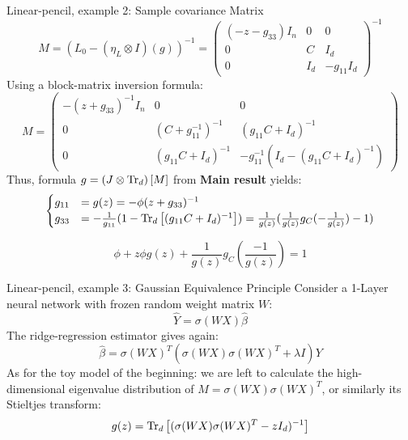 \documentclass[10pt]{beamer}
\begin{document}
\begin{frame}{Linear-pencil, example 2: Sample covariance Matrix}
  \begin{equation*}
    M= (L_0 - (\eta_L \otimes I)(g))^{-1} = 
    \begin{pmatrix}
      (-z - g_{33}) I_n & 0 & 0\\
      0 & C  & I_d\\
      0 & I_d & -g_{11} I_d
    \end{pmatrix}^{-1}
  \end{equation*}
  Using a block-matrix inversion formula:
  \begin{equation*}
    M = 
    \begin{pmatrix}
      -(z + g_{33})^{-1} I_n & 0 & 0\\
      0 & (C+g_{11}^{-1})^{-1} & (g_{11} C + I_d)^{-1}\\
      0 & (g_{11} C + I_d)^{-1} & -g_{11}^{-1} (I_d - (g_{11} C+ I_d)^{-1})
   \end{pmatrix}
  \end{equation*}
  Thus, formula $g = \traceLimOp[d]{M}$ from \textbf{Main result} yields:
  \begin{equation*}
    \begin{cases}
      g_{11} & = g(z) = - \phi (z+ g_{33})^{-1}\\
      g_{33} & = - \frac{1}{g_{11}} (1 - \traceLim[d]{ (g_{11} C + I_d)^{-1}})
      = \frac{1}{g(z)} ( \frac{1}{g(z)} 
      g_C(-\frac{1}{g(z)}) - 1)
    \end{cases}
  \end{equation*}
  \begin{block}{}
      $$
        \phi + z \phi g(z) + \frac{1}{g(z)} 
        g_C \left(\frac{-1}{g(z)}\right) = 1 
      $$
  \end{block}
\end{frame}


\begin{frame}{Linear-pencil, example 3: Gaussian Equivalence Principle}
  Consider a 1-Layer neural network with frozen random weight matrix $W$:
  \begin{equation*}
    \hat Y = \sigma(WX) \hat \beta
  \end{equation*}
  The ridge-regression estimator gives again:
  $$ \hat \beta = \sigma(WX)^T (\sigma(WX) \sigma(WX)^T + \lambda I) Y$$
  As for the toy model of the beginning: we are left to calculate the high-dimensional
  eigenvalue distribution of $M=\sigma(WX) \sigma(WX)^T$, or similarly its Stieltjes transform:
  $$g(z) = \traceLim[d]{(\sigma(WX) \sigma(WX)^T - zI_d)^{-1}}$$
\end{frame}
\end{document}

